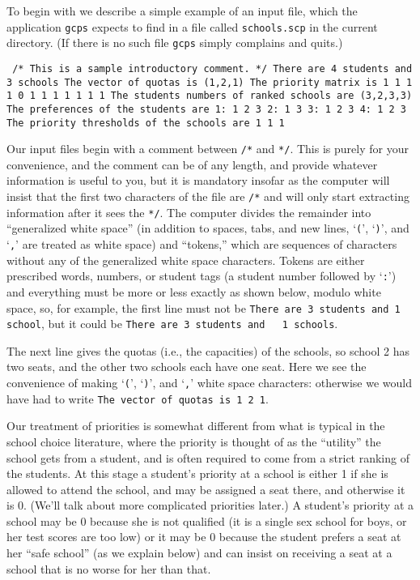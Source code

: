 \documentclass[12pt]{article}
\theoremstyle{definition}
\begin{document}
To begin with we describe a simple example of an input file, which the
application \texttt{gcps} expects to find in a file called
\texttt{schools.scp} in the current directory.  (If there is no such
file \texttt{gcps} simply complains and quits.)

\begin{obeylines}\texttt{
/* This is a sample introductory comment. */
There are 4 students and 3 schools
The vector of quotas is (1,2,1)
The priority matrix is
     1     1     1
     1     0     1
     1     1     1
     1     1     1
The students numbers of ranked schools are (3,2,3,3)
The preferences of the students are
1:  1  2  3  
2:  1  3  
3:  1  2  3  
4:  1  2  3  
The priority thresholds of the schools are
1   1   1   
  }
\end{obeylines}

\medskip

Our input files begin with a comment between \texttt{/*} and
\texttt{*/}.  This is purely for your convenience, and the comment can
be of any length, and provide whatever information is useful to you,
but it is mandatory insofar as the computer will insist that the first
two characters of the file are \texttt{/*} and will only start
extracting information after it sees the \texttt{*/}.  The computer
divides the remainder into ``generalized white space'' (in addition to
spaces, tabs, and new lines, `\texttt{(}', `\texttt{)}', and
`\texttt{,}' are treated as white space) and ``tokens,'' which are
sequences of characters without any of the generalized white space
characters.  Tokens are either prescribed words, numbers, or student
tags (a student number followed by `\texttt{:}') and everything must
be more or less exactly as shown below, modulo white space, so, for
example, the first line must not be \texttt{There are 3 students and 1
  school}, but it could be \texttt{There are 3 students and \ \ 1
  schools}.

The next line gives the quotas (i.e., the capacities) of the schools,
so school 2 has two seats, and the other two schools each have one
seat.  Here we see the convenience of making `\texttt{(}',
`\texttt{)}', and `\texttt{,}' white space characters: otherwise we
would have had to write \texttt{The vector of quotas is 1 2 1}.

Our treatment of priorities is somewhat different from what is typical
in the school choice literature, where the priority is thought of as
the ``utility'' the school gets from a student, and is often required
to come from a strict ranking of the students.  At this stage a
student's priority at a school is either 1 if she is allowed to attend
the school, and may be assigned a seat there, and otherwise it is 0.
(We'll talk about more complicated priorities later.)  A student's
priority at a school may be 0 because she is not qualified (it is a
single sex school for boys, or her test scores are too low) or it may
be 0 because the student prefers a seat at her ``safe school'' (as we
explain below) and can insist on receiving a seat at a school that is
no worse for her than that.
\end{document}
